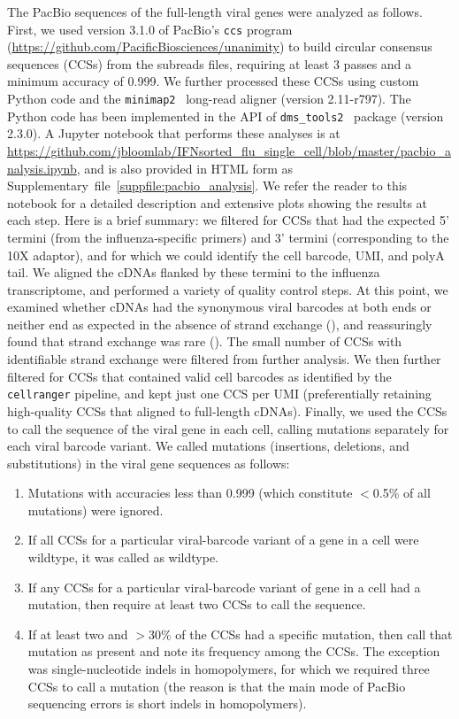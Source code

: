\documentclass[9pt,lineno]{elife}
\begin{document}
The PacBio sequences of the full-length viral genes were analyzed as follows.
First, we used version 3.1.0 of PacBio's \texttt{ccs} program (\url{https://github.com/PacificBiosciences/unanimity}) to build circular consensus sequences (CCSs) from the subreads files, requiring at least 3 passes and a minimum accuracy of 0.999.
We further processed these CCSs using custom Python code and the \texttt{minimap2}~\citep{li2018minimap2} long-read aligner (version 2.11-r797).
The Python code has been implemented in the API of \texttt{dms\_tools2}~\citep[][\url{https://jbloomlab.github.io/dms_tools2/}]{bloom2015software} package (version 2.3.0).
A Jupyter notebook that performs these analyses is at \url{https://github.com/jbloomlab/IFNsorted_flu_single_cell/blob/master/pacbio_analysis.ipynb}, and is also provided in HTML form as Supplementary~file~\ref{suppfile:pacbio_analysis}.
We refer the reader to this notebook for a detailed description and extensive plots showing the results at each step.
Here is a brief summary: we filtered for CCSs that had the expected 5' termini (from the influenza-specific primers) and 3' termini (corresponding to the 10X adaptor), and for which we could identify the cell barcode, UMI, and polyA tail.
We aligned the cDNAs flanked by these termini to the influenza transcriptome, and performed a variety of quality control steps.
At this point, we examined whether cDNAs had the synonymous viral barcodes at both ends or neither end as expected in the absence of strand exchange (), and reassuringly found that strand exchange was rare ().
The small number of CCSs with identifiable strand exchange were filtered from further analysis.
We then further filtered for CCSs that contained valid cell barcodes as identified by the \texttt{cellranger} pipeline, and kept just one CCS per UMI (preferentially retaining high-quality CCSs that aligned to full-length cDNAs).
Finally, we used the CCSs to call the sequence of the viral gene in each cell, calling mutations separately for each viral barcode variant.
We called mutations (insertions, deletions, and substitutions) in the viral gene sequences as follows:
\begin{enumerate}
\item Mutations with accuracies less than 0.999 (which constitute $<$0.5\% of all mutations) were ignored.
\item If all CCSs for a particular viral-barcode variant of a gene in a cell were wildtype, it was called as wildtype.
\item If any CCSs for a particular viral-barcode variant of gene in a cell had a mutation, then require at least two CCSs to call the sequence.
\item If at least two and $>$30\% of the CCSs had a specific mutation, then call that mutation as present and note its frequency among the CCSs. The exception was single-nucleotide indels in homopolymers, for which we required three CCSs to call a mutation (the reason is that the main mode of PacBio sequencing errors is short indels in homopolymers).
\end{enumerate}
\end{document}
